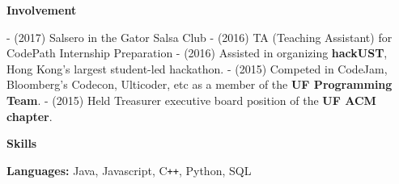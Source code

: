 \documentclass[letterpaper,10pt]{article}
\makeatletter
\newcommand{\resitem}[1]{\item #1 \vspace{-2pt}}
\newcommand{\resheading}[1]{{\large \colorbox{mygrey}{\begin{minipage}{\textwidth}{\textbf{#1 \vphantom{p\^{E}}}}\end{minipage}}}}
\newcommand{\ressubheading}[4]{
\begin{tabular*}{7.0in}{l@{\extracolsep{\fill}}r}
		\textbf{#1} & #2 \\
		\textit{#3} & \textit{#4} \\
\end{tabular*}\vspace{-6pt}}
\makeatother
\begin{document}

\resheading{Involvement}
\newline \newline
- (2017) Salsero in the Gator Salsa Club\newline
- (2016) TA (Teaching Assistant) for CodePath Internship Preparation \newline
- (2016) Assisted in organizing \textbf{hackUST}, Hong Kong's largest student-led hackathon. \newline
- (2015) Competed in CodeJam, Bloomberg's Codecon, Ulticoder, etc as a member of the \textbf{UF Programming Team}. \newline
- (2015) Held Treasurer executive board position of the \textbf{UF ACM chapter}.\newline

\resheading{Skills}
\newline\newline
\textbf{Languages:} \tabto{2.5cm} Java, Javascript, C{}\verb!++!, Python, SQL \newline
\end{document}
